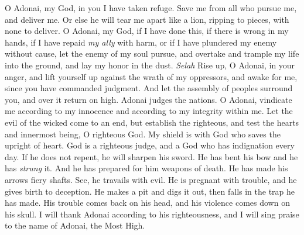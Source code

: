\begin{biblechapter} %
 O Adonai, my God, in you I have taken refuge. 
Save me from all who pursue me, and deliver me.
\verse Or else he will tear me apart like a lion, 
ripping to pieces, with none to deliver.
\verse O Adonai, my God, if I have done this, 
if there is wrong in my hands,
\verse if I have repaid \textit{my ally} with harm, 
or if I have plundered my enemy without cause,
\verse let the enemy of my soul pursue, 
and overtake and trample my life into the ground, 
and lay my honor in the dust. \textit{Selah}
\verse Rise up, O Adonai, in your anger, 
and lift yourself up against the wrath of my oppressors, 
and awake for me, 
since you have commanded judgment.
\verse And let the assembly of peoples surround you, 
and over it return on high.
\verse Adonai judges the nations. 
O Adonai, vindicate me 
according to my innocence and according to my integrity within me.
\verse Let the evil of the wicked come to an end, 
but establish the righteous, 
and test the hearts and innermost being, O righteous God.
\verse My shield is with God 
who saves the upright of heart.
\verse God is a righteous judge, 
and a God who has indignation every day.
\verse If he does not repent, he will sharpen his sword. 
He has bent his bow and he has \textit{strung} it.
\verse And he has prepared for him weapons of death. 
He has made his arrows fiery shafts.
\verse See, he travails with evil. 
He is pregnant with trouble, 
and he gives birth to deception.
\verse He makes a pit and digs it out, 
then falls in the trap he has made.
\verse His trouble comes back on his head, 
and his violence comes down on his skull.
\verse I will thank Adonai according to his righteousness, 
and I will sing praise to the name of Adonai, the Most High.
\end{biblechapter}


